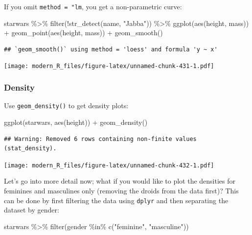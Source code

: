 \documentclass[
]{article}
\newenvironment{Shaded}{\begin{snugshade}}{\end{snugshade}}
\newcommand{\FunctionTok}[1]{\textcolor[rgb]{0.00,0.00,0.00}{#1}}
\newcommand{\NormalTok}[1]{#1}
\newcommand{\SpecialCharTok}[1]{\textcolor[rgb]{0.00,0.00,0.00}{#1}}
\newcommand{\StringTok}[1]{\textcolor[rgb]{0.31,0.60,0.02}{#1}}
\begin{document}
If you omit \texttt{method\ =\ "lm}, you get a non-parametric curve:

\begin{Shaded}
\begin{Highlighting}[]
\NormalTok{starwars }\SpecialCharTok{\%\textgreater{}\%}
  \FunctionTok{filter}\NormalTok{(}\SpecialCharTok{!}\FunctionTok{str\_detect}\NormalTok{(name, }\StringTok{"Jabba"}\NormalTok{)) }\SpecialCharTok{\%\textgreater{}\%}
  \FunctionTok{ggplot}\NormalTok{(}\FunctionTok{aes}\NormalTok{(height, mass)) }\SpecialCharTok{+}
  \FunctionTok{geom\_point}\NormalTok{(}\FunctionTok{aes}\NormalTok{(height, mass)) }\SpecialCharTok{+}
  \FunctionTok{geom\_smooth}\NormalTok{()}
\end{Highlighting}
\end{Shaded}

\begin{verbatim}
## `geom_smooth()` using method = 'loess' and formula 'y ~ x'
\end{verbatim}

\texttt{[image: modern\_R\_files/figure-latex/unnamed-chunk-431-1.pdf]}

\hypertarget{density}{%
\subsubsection{Density}\label{density}}

Use \texttt{geom\_density()} to get density plots:

\begin{Shaded}
\begin{Highlighting}[]
\FunctionTok{ggplot}\NormalTok{(starwars, }\FunctionTok{aes}\NormalTok{(height)) }\SpecialCharTok{+}
  \FunctionTok{geom\_density}\NormalTok{()}
\end{Highlighting}
\end{Shaded}

\begin{verbatim}
## Warning: Removed 6 rows containing non-finite values (stat_density).
\end{verbatim}

\texttt{[image: modern\_R\_files/figure-latex/unnamed-chunk-432-1.pdf]}

Let's go into more detail now; what if you would like to plot the densities for feminines and masculines
only (removing the droids from the data first)? This can be done by first filtering the data using
\texttt{dplyr} and then separating the dataset by gender:

\begin{Shaded}
\begin{Highlighting}[]
\NormalTok{starwars }\SpecialCharTok{\%\textgreater{}\%}
  \FunctionTok{filter}\NormalTok{(gender }\SpecialCharTok{\%in\%} \FunctionTok{c}\NormalTok{(}\StringTok{"feminine"}\NormalTok{, }\StringTok{"masculine"}\NormalTok{))}
\end{Highlighting}
\end{Shaded}
\end{document}
